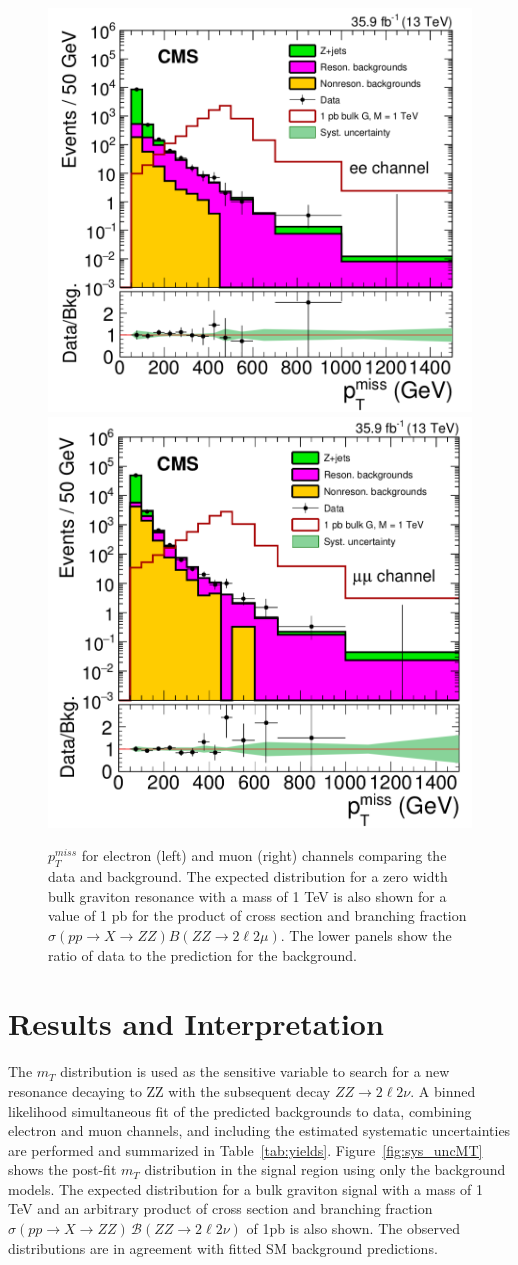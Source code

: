 \begin{figure}[htbp]
\begin{center}
\includegraphics[width=0.49\linewidth]{figures/sys_elSRuncMET.png}
\includegraphics[width=0.49\linewidth]{figures/sys_muSRuncMET.png}
\caption{$p_T ^{miss}$ for electron (left) and muon (right) channels comparing the data and background. The expected distribution for a zero width bulk graviton resonance with a mass of 1 TeV is also shown for a value of 1 pb for the product of cross section and branching fraction $\sigma(pp\rightarrow X\rightarrow ZZ)B(ZZ\rightarrow 2\ell 2\mu)$. The lower panels show the ratio of data to the prediction for the background. }
\label{fig:sys_uncMET}
\end{center}
\end{figure}


\section{Results and Interpretation}
The $m_T$ distribution is used as the sensitive variable to search for a new resonance decaying to ZZ with the subsequent decay $ZZ\rightarrow 2\ell 2\nu$. A binned likelihood simultaneous fit of the predicted backgrounds to data, combining electron and muon channels, and including the estimated systematic uncertainties are performed and summarized in Table~\ref{tab:yields}. Figure~\ref{fig:sys_uncMT} shows the post-fit $m_T$ distribution in the signal region using only the background models. The expected distribution for a bulk graviton signal with a mass of 1 TeV and an arbitrary product of cross section and branching fraction $\sigma(pp \to X\to ZZ)\, \mathcal{B} (ZZ\to2\ell2\nu)$ of 1\unit{pb} is also shown. The observed distributions are in agreement with fitted SM background predictions.


